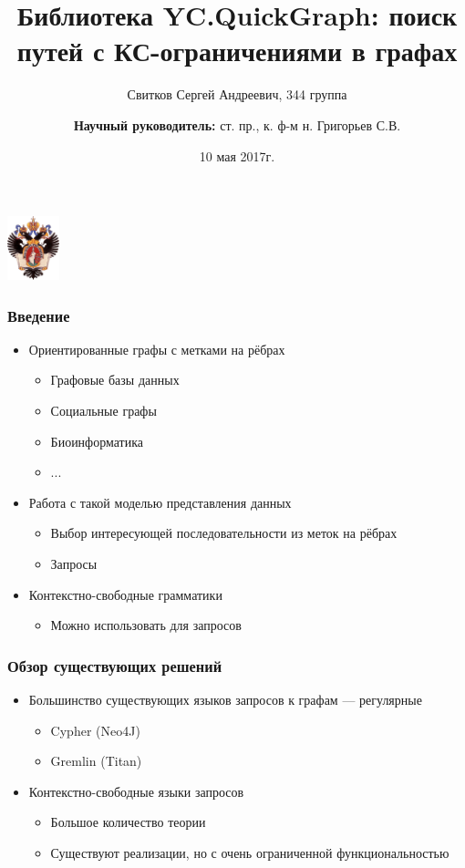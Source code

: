 \documentclass{beamer}
\title[]{Библиотека YC.QuickGraph: поиск путей с КС-ограничениями в графах}
\institute[СПбГУ]{
Санкт-Петербургский государственный университет \\
Кафедра системного программирования }
\author[Свитков Сергей]{Свитков Сергей Андреевич, 344 группа \\
  \and  
    {\bfseries Научный руководитель:} ст. пр., к. ф-м н. Григорьев С.В. \\ }
\date{10 мая 2017г.}
\begin{document}
{
\begin{frame}
  \begin{center}
  {\includegraphics[width=1.5cm]{pictures/SPbGU_Logo.png}}
  \end{center}
  \titlepage
\end{frame}
}

\begin{frame}[fragile]
  \transwipe[direction=90]
  \frametitle{Введение}
  \begin{itemize}
    \item Ориентированные графы с метками на рёбрах
    \begin{itemize}
        \item Графовые базы данных
        \item Социальные графы
        \item Биоинформатика
        \item ...
    \end{itemize}
    \item Работа с такой моделью представления данных
    \begin{itemize}
        \item Выбор интересующей последовательности из меток на рёбрах
        \item Запросы
    \end{itemize}
    \item Контекстно-свободные грамматики
    \begin{itemize}
        \item Можно использовать для запросов
    \end{itemize}
  \end{itemize}
\end{frame}
            
\begin{frame}
  \transwipe[direction=90]
  \frametitle{Обзор существующих решений}
  \begin{itemize}
    \item Большинство существующих языков запросов к графам --- регулярные
    \begin{itemize}
        \item Cypher (Neo4J)
        \item Gremlin (Titan)
    \end{itemize}
    \item Контекстно-свободные языки запросов
    \begin{itemize}
        \item Большое количество теории
        \item Существуют реализации, но с очень ограниченной функциональностью
    \end{itemize}
  \end{itemize}
\end{frame}
\end{document}
